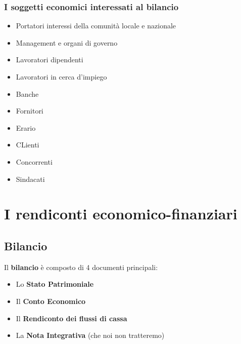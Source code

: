 \documentclass{article}
\begin{document}
\subsubsection*{I soggetti economici interessati al bilancio}
\begin{itemize}
    \item Portatori interessi
    della comunità locale e
    nazionale
    \item Management e organi di governo
    \item Lavoratori dipendenti
    \item Lavoratori in cerca d'impiego
    \item Banche
    \item Fornitori
    \item Erario
    \item CLienti
    \item Concorrenti
    \item Sindacati
\end{itemize}


\section{I rendiconti economico-finanziari}
\subsection{Bilancio}
Il \textbf{bilancio} è  composto di 4 documenti
principali:
\begin{itemize}
    \item Lo \textbf{Stato Patrimoniale}
    \item Il \textbf{Conto Economico}
    \item Il \textbf{Rendiconto dei flussi di cassa}
    \item La \textbf{Nota Integrativa} (che noi non tratteremo)
\end{itemize}
\end{document}
